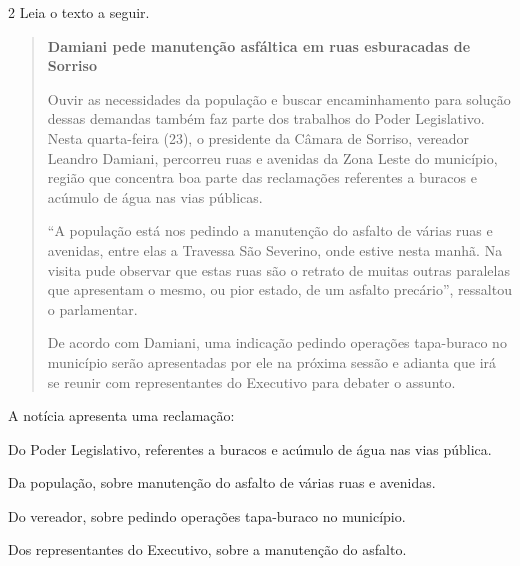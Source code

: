 \num{2} Leia o texto a seguir.

\begin{quote}
\centering\noindent\textbf{Damiani pede manutenção asfáltica em ruas esburacadas de
Sorriso}


\noindent Ouvir as necessidades da população e buscar encaminhamento para solução
dessas demandas também faz parte dos trabalhos do Poder Legislativo.
Nesta quarta-feira (23), o presidente da Câmara de Sorriso, vereador
Leandro Damiani, percorreu ruas e avenidas da Zona Leste do município,
região que concentra boa parte das reclamações referentes a buracos e
acúmulo de água nas vias públicas.

``A população está nos pedindo a manutenção do asfalto de várias ruas e
avenidas, entre elas a Travessa São Severino, onde estive nesta manhã.
Na visita pude observar que estas ruas são o retrato de muitas outras
paralelas que apresentam o mesmo, ou pior estado, de um asfalto
precário'', ressaltou o parlamentar.

De acordo com Damiani, uma indicação pedindo operações tapa-buraco no
município serão apresentadas por ele na próxima sessão e adianta que irá
se reunir com representantes do Executivo para debater o assunto.

\end{quote}

\noindent A notícia apresenta uma reclamação:

\begin{escolha}
\item Do Poder Legislativo, referentes a buracos e acúmulo de água nas vias
pública.
\item Da população, sobre manutenção do asfalto de várias ruas e avenidas.
\item Do vereador, sobre pedindo operações tapa-buraco no município.
\item Dos representantes do Executivo, sobre a manutenção do asfalto.
\end{escolha}



